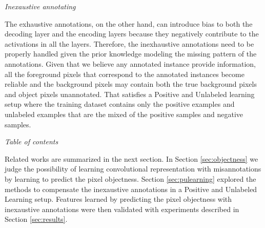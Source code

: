 \noindent
\textit{Inexaustive annotating}

\noindent
The exhaustive annotations, on the other hand, can introduce bias to both the decoding layer and the encoding layers because they negatively contribute to the activations in all the layers.
Therefore, the inexhaustive annotations need to be properly handled given the prior knowledge modeling the missing pattern of the annotations.
Given that we believe any annotated instance provide information, all the foreground pixels that correspond to the annotated instances become reliable and the background pixels may contain both the true background pixels and object pixels unannotated.
That satisfies a Positive and Unlabeled learning setup where the training dataset contains only the positive examples and unlabeled examples that are the mixed of the positive samples and negative samples.



\noindent
\textit{Table of contents}

\noindent
Related works are summarized in the next section.
In Section \ref{sec:objectness} we judge the possibility of learning convolutional representation with misannotations by learning to predict the pixel objectness.
Section \ref{sec:pulearning} explored the methods to compensate the inexaustive annotations in a Positive and Unlabeled Learning setup.
Features learned by predicting the pixel objectness with inexaustive annotations were then validated with experiments described in Section \ref{sec:results}.

%
